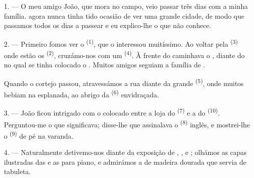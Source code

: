 %

\VUsaut{4.0mm}
\VUsaut{3.0mm}

\VUsaut{3.0mm}

1. --- O meu amigo João, que mora no campo, veio passar três dias com a
minha família.  agora nunca tinha tido ocasião de ver uma
grande cidade, de modo que passamos todos os dias a passear e eu
explico-lhe o que não conhece.

2. --- Primeiro fomos ver o  \textsuperscript{(1)}, que o
interessou muitíssimo. Ao voltar pela  \textsuperscript{(3)} onde estão
os  \textsuperscript{(2)}, cruzámo-nos com um
 \textsuperscript{(4)}. À frente do 
caminhava o , diante do  no qual se
tinha colocado o . Muitos amigos seguiam a família de
.

Quando o cortejo passou, atravessámos a rua diante da grande
 \textsuperscript{(5)}, onde muitos  bebiam
 na esplanada, ao abrigo da 
\textsuperscript{(6)} envidraçada.

3. --- João ficou intrigado com o  colocado entre
a loja do  \textsuperscript{(7)} e a do
 \textsuperscript{(10)}. Perguntou-me o que significava;
disse-lhe que assinalava o  \textsuperscript{(8)} inglês, e
mostrei-lhe o  \textsuperscript{(9)} de pé na varanda.

\VUsaut{3.0mm}

4. --- Naturalmente detivemo-nos diante da exposição de
, ,  e
; olhámos as capas ilustradas das  e as
 para piano, e admirámos a  de madeira dourada
que servia de tabuleta.

